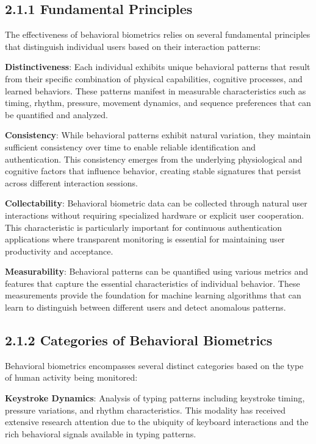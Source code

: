 \documentclass[
  12pt,
  a4paper,
]{report}
\begin{document}
\subsection{2.1.1 Fundamental Principles}\label{fundamental-principles}

The effectiveness of behavioral biometrics relies on several fundamental
principles that distinguish individual users based on their interaction
patterns:

\textbf{Distinctiveness}: Each individual exhibits unique behavioral
patterns that result from their specific combination of physical
capabilities, cognitive processes, and learned behaviors. These patterns
manifest in measurable characteristics such as timing, rhythm, pressure,
movement dynamics, and sequence preferences that can be quantified and
analyzed.

\textbf{Consistency}: While behavioral patterns exhibit natural
variation, they maintain sufficient consistency over time to enable
reliable identification and authentication. This consistency emerges
from the underlying physiological and cognitive factors that influence
behavior, creating stable signatures that persist across different
interaction sessions.

\textbf{Collectability}: Behavioral biometric data can be collected
through natural user interactions without requiring specialized hardware
or explicit user cooperation. This characteristic is particularly
important for continuous authentication applications where transparent
monitoring is essential for maintaining user productivity and
acceptance.

\textbf{Measurability}: Behavioral patterns can be quantified using
various metrics and features that capture the essential characteristics
of individual behavior. These measurements provide the foundation for
machine learning algorithms that can learn to distinguish between
different users and detect anomalous patterns.

\subsection{2.1.2 Categories of Behavioral
Biometrics}\label{categories-of-behavioral-biometrics}

Behavioral biometrics encompasses several distinct categories based on
the type of human activity being monitored:

\textbf{Keystroke Dynamics}: Analysis of typing patterns including
keystroke timing, pressure variations, and rhythm characteristics. This
modality has received extensive research attention due to the ubiquity
of keyboard interactions and the rich behavioral signals available in
typing patterns.
\end{document}
